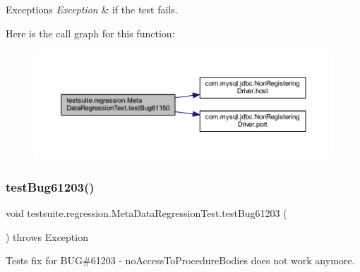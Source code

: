 \begin{DoxyExceptions}{Exceptions}
{\em Exception} & if the test fails. \\
\hline
\end{DoxyExceptions}
Here is the call graph for this function\+:
\nopagebreak
\begin{figure}[H]
\begin{center}
\leavevmode
\includegraphics[width=350pt]{classtestsuite_1_1regression_1_1_meta_data_regression_test_ab171769c1d241e02730a4b626b9bd150_cgraph}
\end{center}
\end{figure}
\mbox{\label{classtestsuite_1_1regression_1_1_meta_data_regression_test_a0dd9e6de4ad836964f235a4a27aed144}} 
\subsubsection{\texorpdfstring{test\+Bug61203()}{testBug61203()}}
{\footnotesize\ttfamily void testsuite.\+regression.\+Meta\+Data\+Regression\+Test.\+test\+Bug61203 (\begin{DoxyParamCaption}{ }\end{DoxyParamCaption}) throws Exception}

Tests fix for B\+UG\#61203 -\/ no\+Access\+To\+Procedure\+Bodies does not work anymore.


